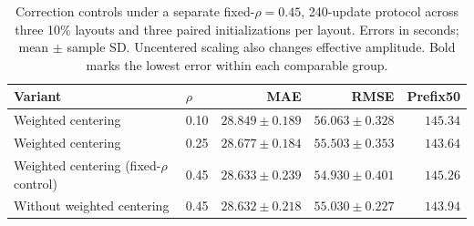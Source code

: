 \begin{table}[t]
\centering\footnotesize\setlength{\tabcolsep}{4pt}
\caption{Correction controls under a separate fixed-$\rho=0.45$, 240-update protocol across three 10\% layouts and three paired initializations per layout. Errors in seconds; mean $\pm$ sample SD. Uncentered scaling also changes effective amplitude. Bold marks the lowest error within each comparable group.}\label{tab:redistribution}
\begin{tabular}{llrrr}\toprule
Variant & $\rho$ & MAE & RMSE & Prefix50\\\midrule
Weighted centering & 0.10 & $28.849\pm0.189$ & $56.063\pm0.328$ & $145.34$\\
Weighted centering & 0.25 & $28.677\pm0.184$ & $55.503\pm0.353$ & $\mathbf{143.64}$\\
Weighted centering (fixed-$\rho$ control) & 0.45 & $28.633\pm0.239$ & $\mathbf{54.930\pm0.401}$ & $145.26$\\
Without weighted centering & 0.45 & $\mathbf{28.632\pm0.218}$ & $55.030\pm0.227$ & $143.94$\\
\bottomrule\end{tabular}
\end{table}
